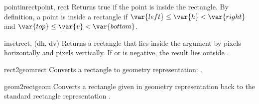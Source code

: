 \begin{funcdesc}{pointinrect}{point, rect}
Returns true if the point is inside the rectangle.  By definition, a
point  is inside a rectangle
 if
\begin{math}\var{left} \leq \var{h} < \var{right}\end{math} and
\begin{math}\var{top} \leq \var{v} < \var{bottom}\end{math}.
\end{funcdesc}

\begin{funcdesc}{inset}{rect, (dh, dv)}
Returns a rectangle that lies inside the  argument by
 pixels horizontally and  pixels vertically.  If
 or  is negative, the result lies outside .
\end{funcdesc}

\begin{funcdesc}{rect2geom}{rect}
Converts a rectangle to geometry representation:
.
\end{funcdesc}

\begin{funcdesc}{geom2rect}{geom}
Converts a rectangle given in geometry representation back to the
standard rectangle representation
.
\end{funcdesc}
